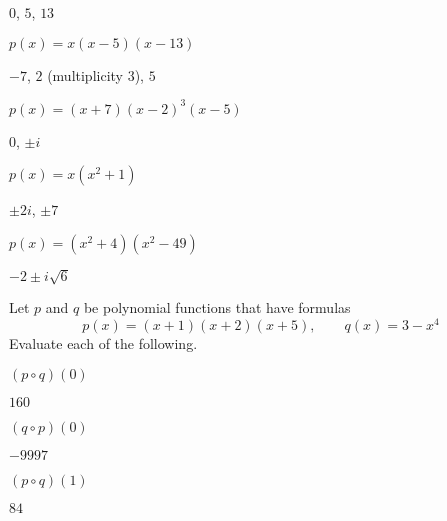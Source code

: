 \begin{exercises}
\begin{problem}
\begin{multicols}{3}
\begin{subproblem}
			 $0$, $5$, $13$
			 \begin{shortsolution}
				 $p(x)=x(x-5)(x-13)$
			 \end{shortsolution}
		 \end{subproblem}
		 \begin{subproblem}
			 $-7$, $2$ (multiplicity $3$), $5$
			 \begin{shortsolution}
				 $p(x)=(x+7)(x-2)^3(x-5)$
			 \end{shortsolution}
		 \end{subproblem}
		 \begin{subproblem}
			 $0$, $\pm i$
			 \begin{shortsolution}
				 $p(x)=x(x^2+1)$
			 \end{shortsolution}
		 \end{subproblem}
		 \begin{subproblem}
			 $\pm 2i$, $\pm 7$
			 \begin{shortsolution}
				 $p(x)=(x^2+4)(x^2-49)$
			 \end{shortsolution}
		 \end{subproblem}
		 \begin{subproblem}
			 $-2\pm i\sqrt{6}$
		 \end{subproblem}
	 \end{multicols}
	 \end{problem}
	 \begin{problem}
	 Let $p$ and $q$ be polynomial functions that have formulas
	 \[
		 p(x)=(x+1)(x+2)(x+5), \qquad q(x)=3-x^4
	 \]
	 Evaluate each of the following.
	 \begin{multicols}{4}
		 \begin{subproblem}
			 $(p\circ q)(0)$
			 \begin{shortsolution}
				 $160$
			 \end{shortsolution}
		 \end{subproblem}
		 \begin{subproblem}
			 $(q\circ p)(0)$
			 \begin{shortsolution}
				 $-9997$
			 \end{shortsolution}
		 \end{subproblem}
		 \begin{subproblem}
			 $(p\circ q)(1)$
			 \begin{shortsolution}
				 $84$
			 \end{shortsolution}

\end{subproblem}
\end{multicols}
\end{problem}
\end{exercises}
